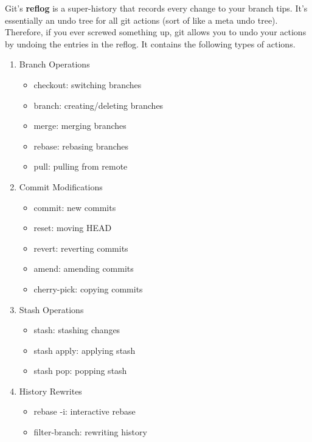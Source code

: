  \begin{definition}[Reflog]
    \label{def:reflog}
    Git's \textbf{reflog} is a super-history that records every change to your branch tips. It's essentially an undo tree for all git actions (sort of like a meta undo tree). Therefore, if you ever screwed something up, git allows you to undo your actions by undoing the entries in the reflog. It contains the following types of actions. 
    \begin{enumerate}
      \item Branch Operations
        \begin{itemize}
          \item checkout: switching branches
          \item branch: creating/deleting branches
          \item merge: merging branches
          \item rebase: rebasing branches
          \item pull: pulling from remote
        \end{itemize}
      
      \item Commit Modifications
        \begin{itemize}
          \item commit: new commits
          \item reset: moving HEAD
          \item revert: reverting commits
          \item amend: amending commits
          \item cherry-pick: copying commits
        \end{itemize}

      \item Stash Operations
        \begin{itemize}
          \item stash: stashing changes
          \item stash apply: applying stash
          \item stash pop: popping stash
        \end{itemize}

      \item History Rewrites
        \begin{itemize}
          \item rebase -i: interactive rebase
          \item filter-branch: rewriting history
        \end{itemize}


\end{enumerate}
\end{definition}
